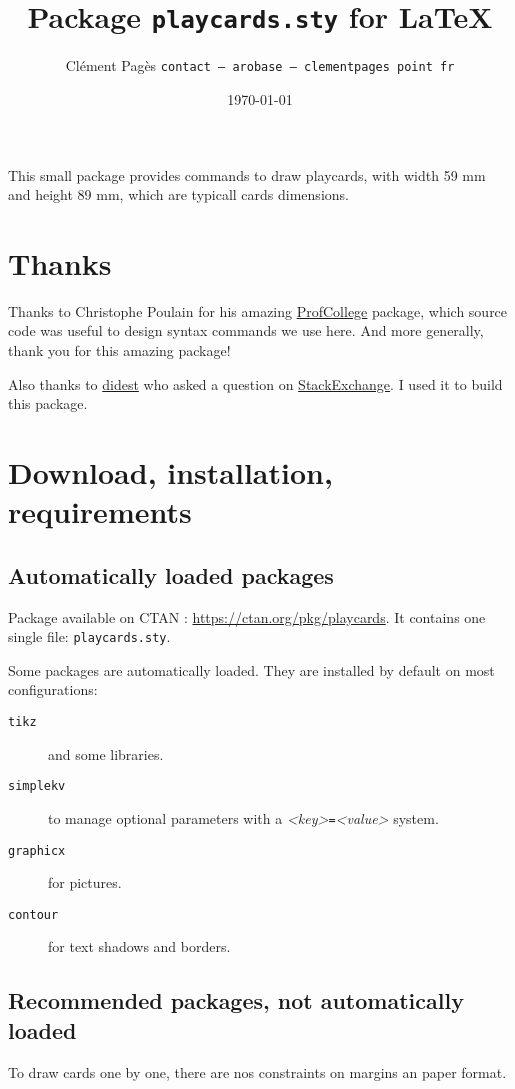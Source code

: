 \documentclass[a4paper, 12pt]{article}
\title{Package \texttt{playcards.sty} for \LaTeX}
\date{\today}
\author{Clément Pagès \texttt{contact -- arobase -- clementpages point fr}}
\newcommand{\package}[1]{\texttt{#1}}
\newcommand{\kv}[2]{\textit{<#1>}\texttt=\textit{<#2>}}
\begin{document}
\maketitle

This small package provides commands to draw playcards, with width 59 mm and height 89 mm, which are typicall cards dimensions.

\tableofcontents
\section*{Thanks}
Thanks to Christophe Poulain for his amazing \href{https://ctan.org/pkg/profcollege}{ProfCollege} package, which source code was useful to design syntax commands we use here. And more generally, thank you for this amazing package!

Also thanks to \href{https://tex.stackexchange.com/users/1948/didest}{didest} who asked a question on \href{https://tex.stackexchange.com/questions/47924/creating-playing-cards-using-tikz}{StackExchange}. I used it to build this package.

\section{Download, installation, requirements}
	\subsection{Automatically loaded packages}
Package available on CTAN : \href{https://ctan.org/pkg/playcards}{https://ctan.org/pkg/playcards}. It contains one single file: \texttt{playcards.sty}.

Some packages are automatically loaded. They are installed by default on most configurations:
\begin{description}
	\item[\package{tikz}] and some libraries.
	\item[\package{simplekv}] to manage optional parameters with a \kv{key}{value} system.
	\item[\package{graphicx}] for pictures. 
	\item[\package{contour}] for text shadows and borders.
\end{description}


	\subsection{Recommended packages, not automatically loaded}
To draw cards one by one, there are nos constraints on margins an paper format.
\end{document}
